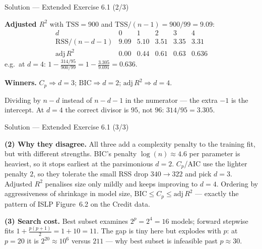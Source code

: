 \documentclass[aspectratio=169,11pt]{beamer}
\begin{document}
\begin{frame}{Solution --- Extended Exercise 6.1 (2/3)}
  \begin{solutionbox}
    \textbf{Adjusted $R^2$} with $\mathrm{TSS}=900$ and
    $\mathrm{TSS}/(n-1)=900/99=9.09$:
    \[
      \begin{array}{c|ccccc}
        d & 0 & 1 & 2 & 3 & 4\\\hline
        \mathrm{RSS}/(n\!-\!d\!-\!1) & 9.09 & 5.10 & 3.51 & 3.35 & 3.31\\[1pt]
        \mathrm{adj}\,R^2 & 0.00 & 0.44 & 0.61 & 0.63 & \mathbf{0.636}
      \end{array}
    \]
    e.g.\ at $d=4$: $1-\tfrac{314/95}{900/99}=1-\tfrac{3.305}{9.091}
    =0.636$.

    \textbf{Winners.} $C_p\Rightarrow d=3$;\quad
    $\mathrm{BIC}\Rightarrow d=2$;\quad
    $\mathrm{adj}\,R^2\Rightarrow d=4$.
  \end{solutionbox}
  \begin{mistake}
    Dividing by $n - d$ instead of $n - d - 1$ in the numerator --- the
    extra $-1$ is the intercept. At $d = 4$ the correct divisor is $95$,
    not $96$: $314/95 = 3.305$.
  \end{mistake}
\end{frame}

\begin{frame}{Solution --- Extended Exercise 6.1 (3/3)}
  \begin{solutionbox}
    \textbf{(2) Why they disagree.} All three add a complexity penalty
    to the training fit, but with different strengths. BIC's penalty
    $\log(n)\approx4.6$ per parameter is heaviest, so it stops earliest
    at the parsimonious $d=2$. $C_p$/AIC use the lighter penalty $2$, so
    they tolerate the small RSS drop $340\!\to\!322$ and pick $d=3$.
    Adjusted $R^2$ penalises size only mildly and keeps improving to
    $d=4$. Ordering by aggressiveness of shrinkage in model size,
    $\mathrm{BIC}\le C_p\le\mathrm{adj}\,R^2$ --- exactly the pattern of
    ISLP Figure~6.2 on the Credit data.

    \textbf{(3) Search cost.} Best subset examines $2^p=2^4=16$ models;
    forward stepwise fits $1+\tfrac{p(p+1)}2=1+10=11$. The gap is tiny
    here but explodes with $p$: at $p=20$ it is $2^{20}\approx10^6$
    versus $211$ --- why best subset is infeasible past $p\approx30$.
  \end{solutionbox}
\end{frame}
\end{document}
